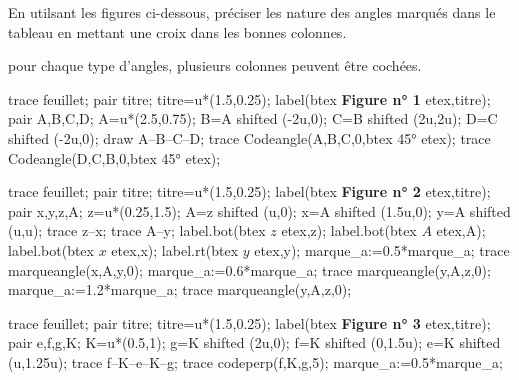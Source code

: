 \begin{corrige}
    En utilsant les figures ci-dessous, préciser les nature des angles marqués dans le tableau en mettant une croix dans les bonnes colonnes.\par
    \begin{changemargin}{-10mm}{-20mm}
        \begin{remarque}
            pour chaque type d'angles, plusieurs colonnes peuvent être cochées.
        \end{remarque}
    \end{changemargin}    
    \begin{changemargin}{0mm}{-20mm}
        \begin{Geometrie}[CoinHD={(3u,3u)}]
            trace feuillet;
            pair titre;
            titre=u*(1.5,0.25);
            label(btex {\bfseries Figure n° 1 } etex,titre);
            pair A,B,C,D;
            A=u*(2.5,0.75);
            B=A shifted (-2u,0);
            C=B shifted (2u,2u);
            D=C shifted (-2u,0);
            draw A--B--C--D;
            trace Codeangle(A,B,C,0,btex \ang{45} etex); 
            trace Codeangle(D,C,B,0,btex \ang{45} etex);
        \end{Geometrie}
        \begin{Geometrie}[CoinHD={(3u,3u)}]
            trace feuillet;
            pair titre;
            titre=u*(1.5,0.25);
            label(btex {\bfseries Figure n° 2 } etex,titre);
            pair x,y,z,A;
            z=u*(0.25,1.5);
            A=z shifted (u,0);
            x=A shifted (1.5u,0);
            y=A shifted (u,u);
            trace z--x;
            trace A--y;
            label.bot(btex $z$ etex,z);
            label.bot(btex $A$ etex,A);
            label.bot(btex $x$ etex,x);
            label.rt(btex $y$ etex,y);
            marque_a:=0.5*marque_a;
            trace marqueangle(x,A,y,0);
            marque_a:=0.6*marque_a;
            trace marqueangle(y,A,z,0);
            marque_a:=1.2*marque_a;
            trace marqueangle(y,A,z,0);
        \end{Geometrie}
        \begin{Geometrie}[CoinHD={(3u,3u)}]
            trace feuillet;
            pair titre;
            titre=u*(1.5,0.25);
            label(btex {\bfseries Figure n° 3 } etex,titre);
            pair e,f,g,K;
            K=u*(0.5,1);
            g=K shifted (2u,0);
            f=K shifted (0,1.5u);
            e=K shifted (u,1.25u);
            trace f--K--e--K--g;
            trace codeperp(f,K,g,5);
            marque_a:=0.5*marque_a;

\end{Geometrie}
\end{changemargin}
\end{corrige}
